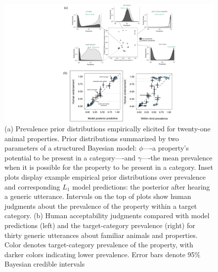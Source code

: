 \documentclass[12pt,letterpaper]{article}
\begin{document}
%

\begin{figure}
\centering
    \includegraphics[width=\columnwidth]{generics-prior-prevalence-tj.pdf}
    \caption{(a) 
    Prevalence prior distributions empirically elicited for twenty-one animal properties.
    Prior distributions summarized by two parameters of a structured Bayesian model: $\phi$----a property's potential to be present in a category----and $\gamma$----the mean prevalence when it is possible for the property to be present in a category.
    Inset plots display example empirical prior distributions over prevalence and corresponding $L_1$ model predictions: the posterior after hearing a generic utterance. 
    Intervals on the top of plots show human judgments about the prevalence of the property within a target category.
    (b)
    Human acceptability judgments compared with model predictions (left) and the target-category prevalence (right) for thirty generic utterances about familiar animals and properties. 
    Color denotes target-category prevalence of the property, with darker colors indicating lower prevalence. 
     Error bars denote 95\% Bayesian credible intervals
    }
  \label{fig:commongenerics}

\end{figure}
\end{document}
